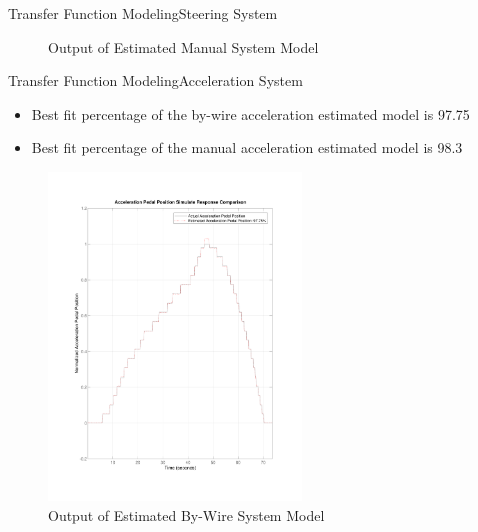 \documentclass{beamer}
\begin{document}
\begin{frame}{Transfer Function Modeling}{Steering System}
\begin{block}{}
\begin{figure}
\begin{minipage}{0.45\textwidth}
        \caption{Output of Estimated Manual System Model}
        \label{fig:manualSteerModel}
    \end{minipage}
\end{figure}
  \end{block}
\end{frame}

\begin{frame}{Transfer Function Modeling}{Acceleration System}
	\begin{block}{}
 \begin{itemize}
	\item Best fit percentage of the by-wire acceleration estimated model is 97.75
	\item Best fit percentage of the manual acceleration estimated model is 98.3
 \end{itemize}
 \begin{figure}
    \centering
    \begin{minipage}{0.45\textwidth}
        \centering
        \includegraphics[width=0.6\textwidth]{figs/img/byWireAccelArxModel} %
        \caption{Output of Estimated By-Wire System Model}
        \label{fig:byWireAccelModel}
    \end{minipage}\hfill
    \begin{minipage}{0.45\textwidth}
        \centering

\end{minipage}
\end{figure}
\end{block}
\end{frame}
\end{document}
